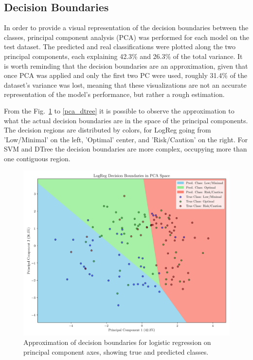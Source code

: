 \documentclass[conference]{IEEEtran}
\begin{document}
\subsection{Decision Boundaries}

In order to provide a visual representation of the decision boundaries between the classes, principal component analysis (PCA) was performed for each model on the test dataset. The predicted and real classifications were plotted along the two principal components, each explaining 42.3\% and 26.3\% of the total variance. It is worth reminding that the decision boundaries are an approximation, given that once PCA was applied and only the first two PC were used, roughly 31.4\% of the dataset's variance was lost, meaning that these visualizations are not an accurate representation of the model's performance, but rather a rough estimation.

From the Fig.~\ref{pca_reglog} to \ref{pca_dtree} it is possible to observe the approximation to what the actual decision boundaries are in the space of the principal components. The decision regions are distributed by colors, for LogReg going from 'Low/Minimal' on the left, 'Optimal' center, and 'Risk/Caution' on the right. For SVM and DTree the decision boundaries are more complex, occupying more than one contiguous region.

\begin{figure}[H]
    \centering
    \includegraphics[width=1\linewidth]{assets/pca_reglog.png}
    \caption{Approximation of decision boundaries for logistic regression on principal component axes, showing true and predicted classes.}
    \label{pca_reglog}
\end{figure} %
\end{document}
